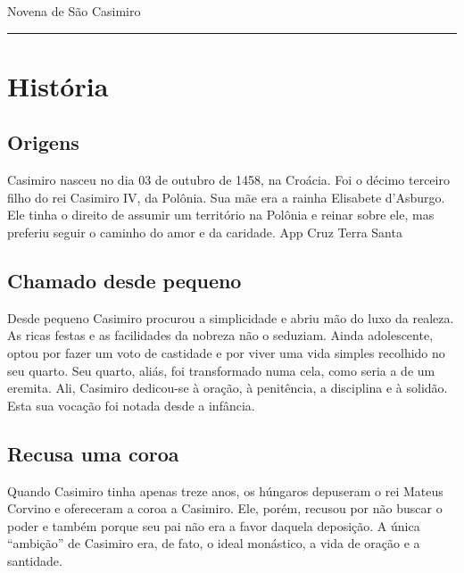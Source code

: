 \documentclass[a4paper,14pt]{extarticle} \usepackage[utf8]{inputenc}
\begin{document}


\begin{center}
  {\huge Novena de São Casimiro}
\end{center}



\noindent\rule{\textwidth}{0.4pt}

\tableofcontents

\thispagestyle{empty}


\newpage

\section{História}

\subsection{Origens}

Casimiro nasceu no dia 03 de outubro de 1458, na Croácia. Foi o décimo terceiro filho do rei Casimiro IV, da Polônia. Sua mãe era a rainha Elisabete d'Asburgo. Ele tinha o direito de assumir um território na Polônia e reinar sobre ele, mas preferiu seguir o caminho do amor e da caridade.
App Cruz Terra Santa

\subsection{Chamado desde pequeno}

Desde pequeno Casimiro procurou a simplicidade e abriu mão do luxo da realeza. As ricas festas e as facilidades da nobreza não o seduziam. Ainda adolescente, optou por fazer um voto de castidade e por viver uma vida simples recolhido no seu quarto. Seu quarto, aliás, foi transformado numa cela, como seria a de um eremita. Ali, Casimiro dedicou-se à oração, à penitência, a disciplina e à solidão. Esta sua vocação foi notada desde a infância.

\subsection{Recusa uma coroa}

Quando Casimiro tinha apenas treze anos, os húngaros depuseram o rei Mateus Corvino e ofereceram a coroa a Casimiro. Ele, porém, recusou por não buscar o poder e também porque seu pai não era a favor daquela deposição. A única “ambição” de Casimiro era, de fato, o ideal monástico, a vida de oração e a santidade.
\end{document}
